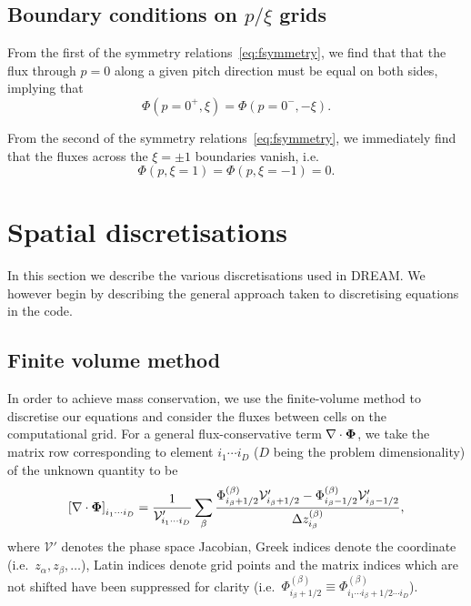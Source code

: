 \documentclass{notes}
\newcommand{\DREAM}{\textsc{DREAM}}
\newcommand{\Vp}{\mathcal{V}'}
\begin{document}
    \subsection{Boundary conditions on $p/\xi$ grids}
    From the first of the symmetry relations~\eqref{eq:fsymmetry}, we find that
    that the flux through $p=0$ along a given pitch direction must be equal on
    both sides, implying that
    \begin{equation}
        \Phi\left(p=0^+, \xi\right) = \Phi\left(p=0^-, -\xi\right).
    \end{equation}

    From the second of the symmetry relations~\eqref{eq:fsymmetry}, we
    immediately find that the fluxes across the $\xi=\pm1$ boundaries vanish,
    i.e.\
    \begin{equation}\label{eq:bc:xiInternal}
        \Phi(p, \xi=1) = \Phi(p, \xi=-1) = 0.
    \end{equation}

    \section{Spatial discretisations}
    In this section we describe the various discretisations used in \DREAM. We
    however begin by describing the general approach taken to discretising
    equations in the code.

    \subsection{Finite volume method}
    In order to achieve mass conservation, we use the finite-volume method to
    discretise our equations and consider the fluxes between cells on the
    computational grid. For a general flux-conservative term
    $\nabla\cdot\boldsymbol{\Phi}$, we take the matrix row corresponding to element
    $i_1\cdots i_D$ ($D$ being the problem dimensionality) of the unknown
    quantity to be
    \begin{equation}
        \left[ \nabla\cdot\bb{\Phi} \right]_{i_1\cdots i_D}  =
            \frac{1}{\Vp_{i_1\cdots i_D}}\sum_\beta \frac{
                \Phi^{(\beta)}_{i_\beta+1/2} \Vp_{i_\beta+1/2} -
                \Phi^{(\beta)}_{i_\beta-1/2} \Vp_{i_\beta-1/2}
            }{\Delta z^{(\beta)}_{i_\beta}},
    \end{equation}
    where $\Vp$ denotes the phase space Jacobian, Greek indices denote the
    coordinate (i.e.\ $z_\alpha, z_\beta, \ldots$), Latin indices denote grid
    points and the matrix indices which are not shifted have been suppressed for
    clarity (i.e.\
    $\Phi^{(\beta)}_{i_\beta+1/2}\equiv\Phi^{(\beta)}_{i_1\cdots i_\beta+1/2\cdots i_D}$).
\end{document}
